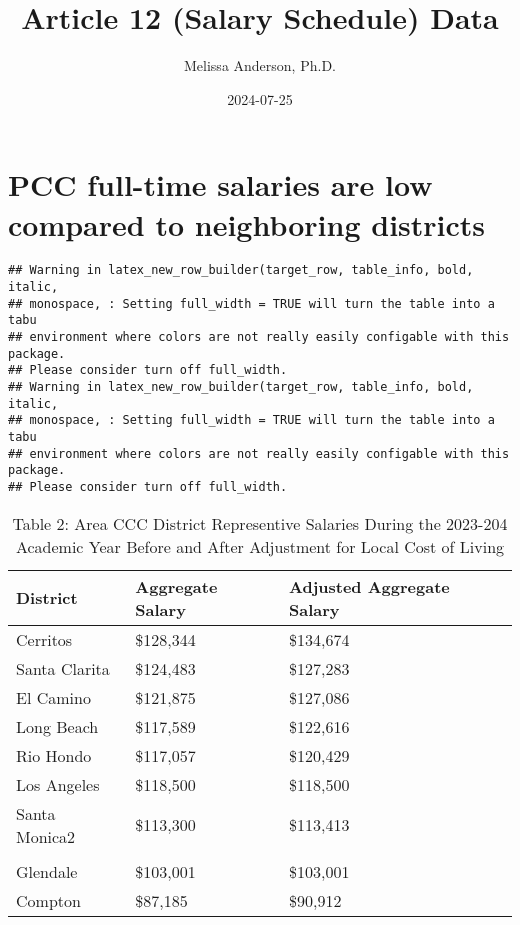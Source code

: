 \documentclass[
]{article}
\title{Article 12 (Salary Schedule) Data}
\author{Melissa Anderson, Ph.D.}
\date{2024-07-25}
\begin{document}
\maketitle

\section{PCC full-time salaries are low compared to neighboring
districts}\label{pcc-full-time-salaries-are-low-compared-to-neighboring-districts}

\begin{verbatim}
## Warning in latex_new_row_builder(target_row, table_info, bold, italic,
## monospace, : Setting full_width = TRUE will turn the table into a tabu
## environment where colors are not really easily configable with this package.
## Please consider turn off full_width.
## Warning in latex_new_row_builder(target_row, table_info, bold, italic,
## monospace, : Setting full_width = TRUE will turn the table into a tabu
## environment where colors are not really easily configable with this package.
## Please consider turn off full_width.
\end{verbatim}

\begin{table}[left]
\centering
\caption{\label{tab:unnamed-chunk-1}Table 2: Area CCC District Representive Salaries During the 2023-204 Academic Year Before and After Adjustment for Local Cost of Living}
\centering
\begin{tabu} to 
\hline
District & Aggregate Salary & Adjusted Aggregate Salary\\
\hline
Cerritos & \$128,344 & \$134,674\\
\hline
Santa Clarita & \$124,483 & \$127,283\\
\hline
El Camino & \$121,875 & \$127,086\\
\hline
Long Beach & \$117,589 & \$122,616\\
\hline
Rio Hondo & \$117,057 & \$120,429\\
\hline
Los Angeles & \$118,500 & \$118,500\\
\hline
Santa Monica2 & \$113,300 & \$113,413\\
\hline
{} &  & \\
\hline
Glendale & \$103,001 & \$103,001\\
\hline
Compton & \$87,185 & \$90,912\\
\hline
\end{tabu}
\end{table}
\end{document}
